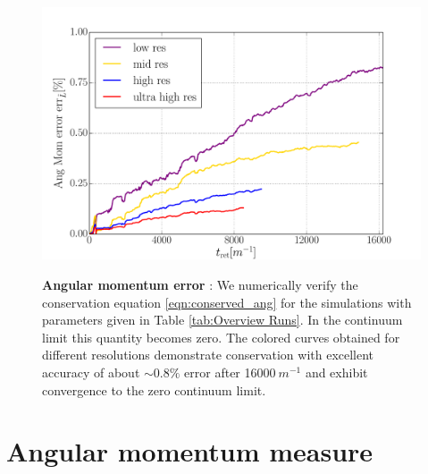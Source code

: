 \documentclass[aps,twocolumn,nofootinbib,superscriptaddress,amsfonts,floatfix
]{revtex4-1} %
\begin{document}
\begin{figure}[ht]
\begin{center}
{\includegraphics[width=1.0\columnwidth]{ang_error_flux_with_radius_60.pdf}}
    \caption{{\bf Angular momentum error }: We numerically
    verify the conservation equation
    \ref{eqn:conserved_ang} for the simulations with parameters 
    given in Table \ref{tab:Overview Runs}. In the continuum limit this
    quantity becomes zero. The colored curves
    obtained for different resolutions demonstrate
    conservation with excellent accuracy of
    about $\sim 0.8\%$ error after 16000$~m^{-1}$
    and exhibit convergence to the zero continuum limit.
    }
\label{fig:ViolCons}
\end{center}
\end{figure}


\section{Angular momentum measure}\label{sec:methods}
\end{document}
